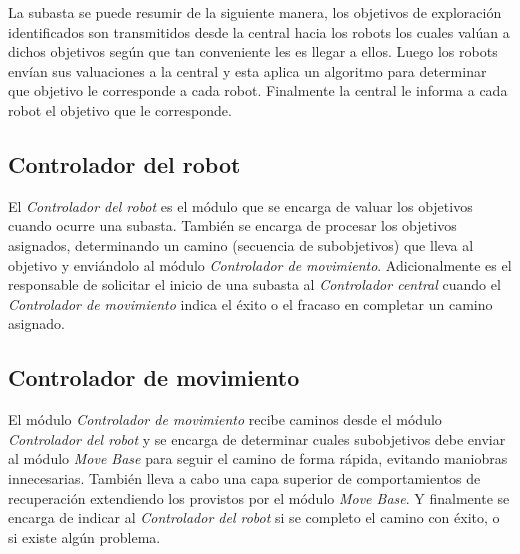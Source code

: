 La subasta se puede resumir de la siguiente manera, los objetivos de
exploración identificados son transmitidos desde la central hacia los robots
los cuales valúan a dichos objetivos según que tan conveniente les es llegar a
ellos. Luego los robots envían sus valuaciones a la central y esta aplica un
algoritmo para determinar que objetivo le corresponde a cada robot. Finalmente
la central le informa a cada robot el objetivo que le corresponde.

\subsection{Controlador del robot}
El \emph{Controlador del robot} es el módulo que se encarga de valuar los
objetivos cuando ocurre una subasta. También se encarga de procesar los
objetivos asignados, determinando un camino (secuencia de subobjetivos) que
lleva al objetivo y enviándolo al módulo \emph{Controlador de movimiento}.
Adicionalmente es el responsable de solicitar el inicio de una subasta al
\emph{Controlador central} cuando el \emph{Controlador de movimiento} indica el
éxito o el fracaso en completar un camino asignado.

\subsection{Controlador de movimiento}
El módulo \emph{Controlador de movimiento} recibe caminos desde el módulo
\emph{Controlador del robot} y se encarga de determinar cuales subobjetivos
debe enviar al módulo \emph{Move Base} para seguir el camino de forma rápida,
evitando maniobras innecesarias. También lleva a cabo una capa superior de
comportamientos de recuperación extendiendo los provistos por el módulo
\emph{Move Base}. Y finalmente se encarga de indicar al \emph{Controlador del
robot} si se completo el camino con éxito, o si existe algún problema.

